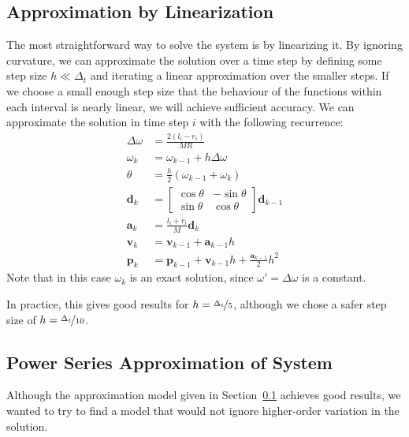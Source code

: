 \documentclass{report}
\begin{document}
\subsection{Approximation by Linearization} \label{sec:linearapprox}
The most straightforward way to solve the system is by linearizing it. By ignoring
curvature, we can approximate the solution over a time step by defining some step size $h \ll \Delta_t$
and iterating a linear approximation over the smaller steps.
If we choose a small enough step size that the behaviour of the
functions within each interval is nearly linear, we will achieve sufficient accuracy. We can approximate
the solution in time step $i$ with the following recurrence:
\begin{align*}
    \Delta\omega &= \frac{2(l_i - r_i)}{MR} \\
    \omega_k &= \omega_{k-1} + h \Delta\omega \\
    \theta &= \frac{h}{2} (\omega_{k-1} + \omega_k) \\
    \mathbf{d}_k &= \begin{bmatrix}\cos \theta & -\sin \theta \\ \sin \theta & \cos \theta\end{bmatrix} \mathbf{d}_{k-1} \\
    \mathbf{a}_k &= \frac{l_i + r_i}{M} \mathbf{d}_{k} \\
    \mathbf{v}_k &= \mathbf{v}_{k-1} + \mathbf{a}_{k-1} h \\
    \mathbf{p}_k &= \mathbf{p}_{k-1} + \mathbf{v}_{k-1} h + \frac{\mathbf{a}_{k-1}}{2} h^2
\end{align*}
Note that in this case $\omega_k$ is an exact solution, since $\omega' = \Delta\omega$ is a constant.

In practice, this gives good results for $h = \nicefrac{\Delta_t}{5}$, although we chose a
safer step size of $h = \nicefrac{\Delta_t}{10}$.


\subsection{Power Series Approximation of System} \label{sec:power}
Although the approximation model given in Section~\ref{sec:linearapprox}
achieves good results, we wanted to try to find a model that would not ignore higher-order
variation in the solution.
\end{document}

